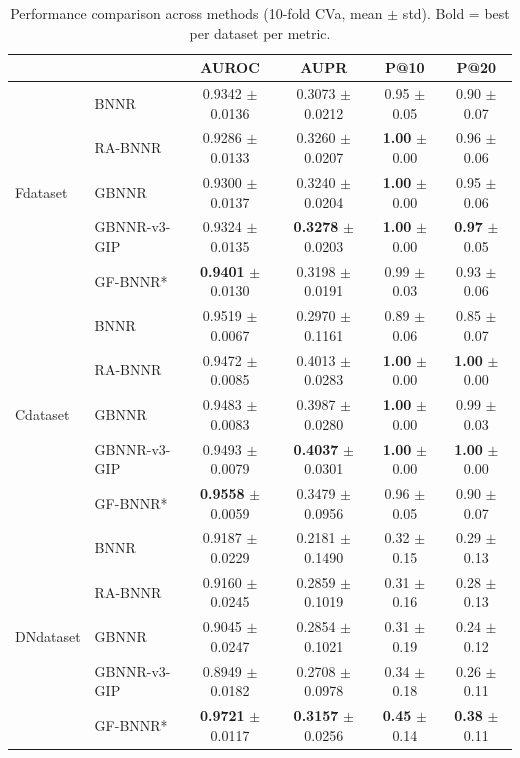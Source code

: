 \documentclass[unnumsec,webpdf,contemporary,large]{oup-authoring-template}
\begin{document}
\begin{table}[t]
\centering
\caption{Performance comparison across methods (10-fold CVa, mean $\pm$ std). Bold = best per dataset per metric.}
\label{tab:performance}
\begin{tabular}{llcccc}
\toprule
& & \textbf{AUROC} & \textbf{AUPR} & \textbf{P@10} & \textbf{P@20} \\
\midrule
\multirow{5}{*}{Fdataset}
  & BNNR
    & 0.9342 $\pm$ 0.0136
    & 0.3073 $\pm$ 0.0212
    & 0.95 $\pm$ 0.05
    & 0.90 $\pm$ 0.07 \\
  & RA-BNNR
    & 0.9286 $\pm$ 0.0133
    & 0.3260 $\pm$ 0.0207
    & \textbf{1.00} $\pm$ 0.00
    & 0.96 $\pm$ 0.06 \\
  & GBNNR
    & 0.9300 $\pm$ 0.0137
    & 0.3240 $\pm$ 0.0204
    & \textbf{1.00} $\pm$ 0.00
    & 0.95 $\pm$ 0.06 \\
  & GBNNR-v3-GIP
    & 0.9324 $\pm$ 0.0135
    & \textbf{0.3278} $\pm$ 0.0203
    & \textbf{1.00} $\pm$ 0.00
    & \textbf{0.97} $\pm$ 0.05 \\
  & GF-BNNR*
    & \textbf{0.9401} $\pm$ 0.0130
    & 0.3198 $\pm$ 0.0191
    & 0.99 $\pm$ 0.03
    & 0.93 $\pm$ 0.06 \\
\midrule
\multirow{5}{*}{Cdataset}
  & BNNR
    & 0.9519 $\pm$ 0.0067
    & 0.2970 $\pm$ 0.1161
    & 0.89 $\pm$ 0.06
    & 0.85 $\pm$ 0.07 \\
  & RA-BNNR
    & 0.9472 $\pm$ 0.0085
    & 0.4013 $\pm$ 0.0283
    & \textbf{1.00} $\pm$ 0.00
    & \textbf{1.00} $\pm$ 0.00 \\
  & GBNNR
    & 0.9483 $\pm$ 0.0083
    & 0.3987 $\pm$ 0.0280
    & \textbf{1.00} $\pm$ 0.00
    & 0.99 $\pm$ 0.03 \\
  & GBNNR-v3-GIP
    & 0.9493 $\pm$ 0.0079
    & \textbf{0.4037} $\pm$ 0.0301
    & \textbf{1.00} $\pm$ 0.00
    & \textbf{1.00} $\pm$ 0.00 \\
  & GF-BNNR*
    & \textbf{0.9558} $\pm$ 0.0059
    & 0.3479 $\pm$ 0.0956
    & 0.96 $\pm$ 0.05
    & 0.90 $\pm$ 0.07 \\
\midrule
\multirow{5}{*}{DNdataset}
  & BNNR
    & 0.9187 $\pm$ 0.0229
    & 0.2181 $\pm$ 0.1490
    & 0.32 $\pm$ 0.15
    & 0.29 $\pm$ 0.13 \\
  & RA-BNNR
    & 0.9160 $\pm$ 0.0245
    & 0.2859 $\pm$ 0.1019
    & 0.31 $\pm$ 0.16
    & 0.28 $\pm$ 0.13 \\
  & GBNNR
    & 0.9045 $\pm$ 0.0247
    & 0.2854 $\pm$ 0.1021
    & 0.31 $\pm$ 0.19
    & 0.24 $\pm$ 0.12 \\
  & GBNNR-v3-GIP
    & 0.8949 $\pm$ 0.0182
    & 0.2708 $\pm$ 0.0978
    & 0.34 $\pm$ 0.18
    & 0.26 $\pm$ 0.11 \\
  & GF-BNNR*
    & \textbf{0.9721} $\pm$ 0.0117
    & \textbf{0.3157} $\pm$ 0.0256
    & \textbf{0.45} $\pm$ 0.14
    & \textbf{0.38} $\pm$ 0.11 \\
\bottomrule
\end{tabular}


\end{table}
\end{document}
